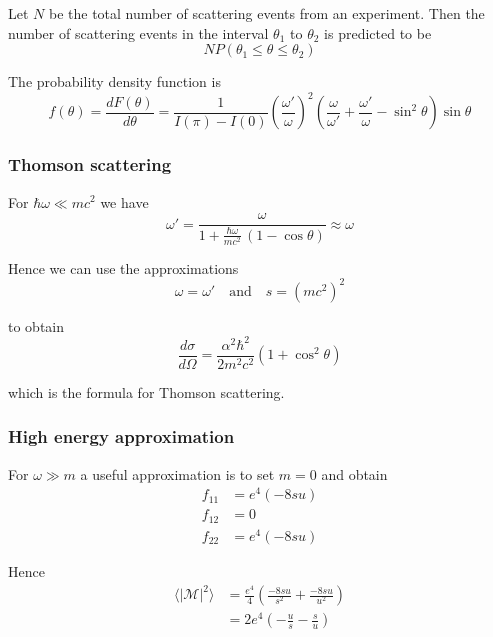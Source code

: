 Let $N$ be the total number of scattering events from an experiment.
Then the number of scattering events in the interval $\theta_1$
to $\theta_2$ is predicted to be
\begin{equation*}
NP(\theta_1\le\theta\le\theta_2)
\end{equation*}

The probability density function is
\begin{equation*}
f(\theta)=\frac{dF(\theta)}{d\theta}
=\frac{1}{I(\pi)-I(0)}
\left(\frac{\omega'}{\omega}\right)^2
\left(\frac{\omega}{\omega'}+\frac{\omega'}{\omega}-\sin^2\theta\right)
\sin\theta
\end{equation*}

\subsubsection*{Thomson scattering}
For $\hbar\omega\ll mc^2$ we have
\begin{equation*}
\omega'=\frac{\omega}{1+\frac{\hbar\omega}{mc^2}\,(1-\cos\theta)}\approx\omega
\end{equation*}

Hence we can use the approximations
\begin{equation*}
\omega=\omega'\quad\text{and}\quad s=(mc^2)^2
\end{equation*}

to obtain
\begin{equation*}
\frac{d\sigma}{d\Omega}=\frac{\alpha^2\hbar^2}{2m^2c^2}\left(1+\cos^2\theta\right)
\end{equation*}

which is the formula for Thomson scattering.

\subsubsection*{High energy approximation}
For $\omega\gg m$ a useful approximation is to set $m=0$ and obtain
\begin{align*}
f_{11}&=e^4(-8su)
\\
f_{12}&=0
\\
f_{22}&=e^4(-8su)
\end{align*}

Hence
\begin{align*}
\langle|\mathcal{M}|^2\rangle
&=\frac{e^4}{4}
\left(\frac{-8su}{s^2}+\frac{-8su}{u^2}\right)
\\
&=2e^4
\left(-\frac{u}{s}-\frac{s}{u}\right)
\end{align*}

